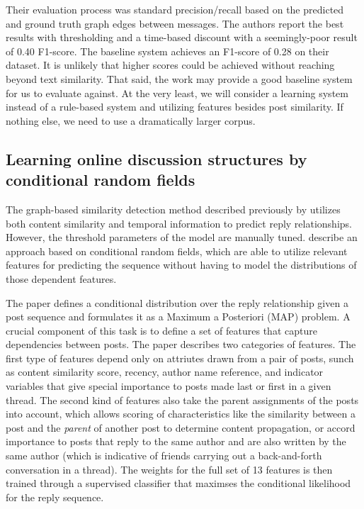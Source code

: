 \documentclass{article}
\begin{document}
Their evaluation process was standard precision/recall based on the predicted
and ground truth graph edges between messages. The authors report the best
results with thresholding and a time-based discount with a seemingly-poor
result of 0.40 F1-score. The baseline system achieves an F1-score of 0.28 on
their dataset. It is unlikely that higher scores could be achieved without
reaching beyond text similarity. That said, the work may provide a good
baseline system for us to evaluate against. At the very least, we will
consider a learning system instead of a rule-based system and utilizing
features besides post similarity. If nothing else, we need to use a
dramatically larger corpus.

\subsection{Learning online discussion structures by conditional random fields}
The graph-based similarity detection method described previously by
\cite{Wang2008a} utilizes both content similarity and temporal information to
predict reply relationships. However, the threshold parameters of the model
are manually tuned. \cite{Wang2011} describe an approach based on conditional
random fields, which are able to utilize relevant features for predicting the
sequence without having to model the distributions of those dependent
features.

The \cite{Wang2011} paper defines a conditional distribution over the reply
relationship given a post sequence and formulates it as a Maximum a Posteriori
(MAP) problem. A crucial component of this task is to define a set of features
that capture dependencies between posts. The paper describes two categories of
features. The first type of features depend only on attriutes drawn from a
pair of posts, sunch as content similarity score, recency, author name
reference, and indicator variables that give special importance to posts made
last or first in a given thread. The second kind of features also take the
parent assignments of the posts into account, which allows scoring of
characteristics like the similarity between a post and the \emph{parent} of
another post to determine content propagation, or accord importance to posts
that reply to the same author and are also written by the same author (which
is indicative of friends carrying out a back-and-forth conversation in a
thread). The weights for the full set of 13 features is then trained through a
supervised classifier that maximses the conditional likelihood for the reply
sequence.
\end{document}
